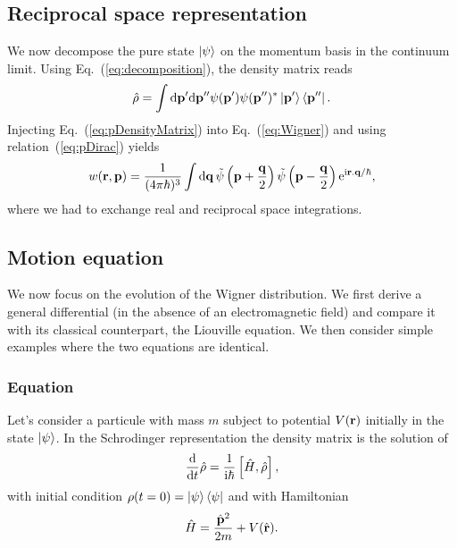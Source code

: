 \subsection{Reciprocal space representation}

We now decompose the pure state $\left| \psi \right\rangle$ on the momentum basis in the continuum limit.
Using Eq.~(\ref{eq:decomposition}), the density matrix reads
\begin{equation}
	\label{eq:pDensityMatrix}
	\hat{\rho} = \int \mathrm{d}\mathbf{ p' }\mathrm{d}\mathbf{ p'' } \psi(\mathbf{ p' }) \psi(\mathbf{ p'' })^{\ast} \left| \mathbf{ p' } \right\rangle\left\langle \mathbf{ p'' } \right| .
\end{equation}
Injecting Eq.~(\ref{eq:pDensityMatrix}) into Eq.~(\ref{eq:Wigner}) and using relation~(\ref{eq:pDirac}) yields
\begin{equation}
	\label{eq:pWigner}
	w(\mathbf{ r }, \mathbf{ p }) = \frac{1}{(4\pi\hbar)^3} \int \mathrm{d}\mathbf{ q } \, \tilde{\psi}\left( \mathbf{ p }+\frac{\mathbf{ q }}{2} \right) \tilde{\psi}\left( \mathbf{ p }-\frac{\mathbf{ q }}{2} \right) \mathrm{e}^{\mathrm{i} \mathbf{ r }.\mathbf{ q }/\hbar } ,
\end{equation}
where we had to exchange real and reciprocal space integrations.



\subsection{Motion equation}

We now focus on the evolution of the Wigner distribution. We first derive a general differential (in the absence of an electromagnetic field) and compare it with its classical counterpart, the Liouville equation. We then consider simple examples where the two equations are identical.


\subsubsection{Equation}

Let's consider a particule with mass $m$ subject to potential $V(\mathbf{ r })$ initially in the state $\left| \psi \right\rangle$. In the Schrodinger representation the density matrix is the solution of
\begin{equation}
	\label{eq:evolutionDensityMatrix}
	\frac{\mathrm{d} }{\mathrm{d} t} \hat{\rho} = \frac{1}{\mathrm{i}\hbar}\left[ \hat{H} , \hat{\rho} \right] ,
\end{equation}
with initial condition $\rho(t=0) = \left| \psi \right\rangle\left\langle \psi \right|$ and with Hamiltonian
\begin{equation}
	\label{eq:Hamiltonian}
	\hat{H} = \frac{\hat{\mathbf{ p }}^2}{2m} + V(\hat{\mathbf{ r }}) .
\end{equation}

